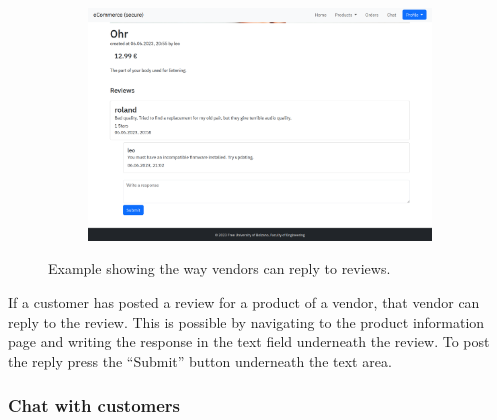 \documentclass[conference,onecolumn,a4paper]{IEEEtran}
\begin{document}
\begin{figure}[H]
    \centering
    \begin{subfigure}[b]{0.4\linewidth}
        \includegraphics[width=\linewidth]{resources/response.png}
    \end{subfigure}
    \caption{Example showing the way vendors can reply to reviews.}
\end{figure}

If a customer has posted a review for a product of a vendor, that vendor can reply to the review. This is possible by navigating to the product information page and writing the response in the text field underneath the review. To post the reply press the “Submit” button underneath the text area.

\subsubsection{Chat with customers}
\end{document}
